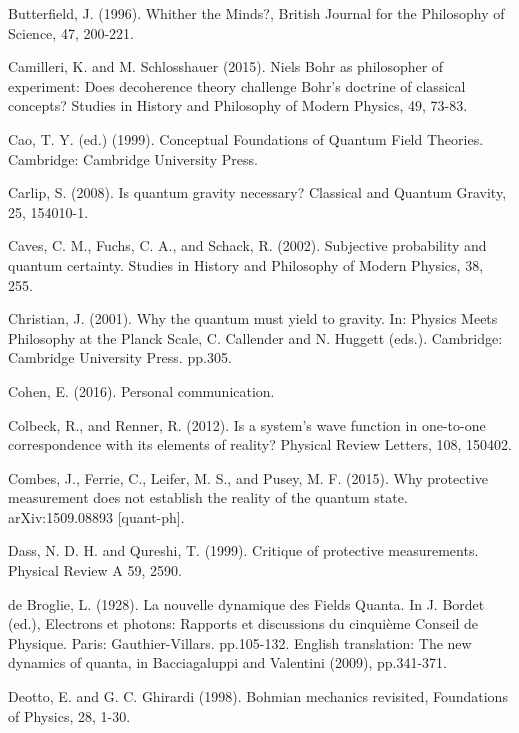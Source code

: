 \begin{thebibliography}{}
\bibitem{} Butterfield, J. (1996). Whither the Minds?, British Journal for the Philosophy of Science, 47, 200-221.

\bibitem{}  Camilleri, K. and M. Schlosshauer (2015). Niels Bohr as philosopher of experiment: Does decoherence theory challenge Bohr's doctrine of classical concepts? Studies in History and Philosophy of Modern Physics, 49, 73-83.

\bibitem{} Cao, T. Y. (ed.) (1999). Conceptual Foundations of Quantum Field Theories. Cambridge: Cambridge University Press.

\bibitem{}  Carlip, S. (2008). Is quantum gravity necessary? Classical and Quantum Gravity, 25, 154010-1.


\bibitem{} Caves, C. M., Fuchs, C. A., and Schack, R. (2002). Subjective probability and quantum certainty. Studies in History and Philosophy of Modern Physics, 38, 255.

\bibitem{} Christian,  J. (2001). Why the quantum must yield to gravity. In: Physics Meets Philosophy at the Planck Scale,  C. Callender and N. Huggett (eds.). Cambridge: Cambridge University Press. pp.305.

\bibitem{} Cohen, E. (2016). Personal communication.

\bibitem{} Colbeck, R., and Renner, R. (2012). Is a system's wave function in one-to-one correspondence with its elements of reality? Physical Review Letters, 108, 150402.

\bibitem{} Combes, J., Ferrie, C., Leifer, M. S., and Pusey, M. F. (2015). Why protective measurement does not establish the reality of the quantum state. arXiv:1509.08893 [quant-ph].

\bibitem{} Dass, N. D. H. and Qureshi, T. (1999). Critique of protective measurements. Physical Review A 59, 2590.

\bibitem{} de Broglie, L. (1928). La nouvelle dynamique des Fields Quanta. In J. Bordet (ed.), Electrons et photons: Rapports et discussions du cinquième Conseil de Physique. Paris: Gauthier-Villars. pp.105-132. English translation: The new dynamics of quanta, in Bacciagaluppi and Valentini (2009), pp.341-371.

\bibitem{}  Deotto, E. and G. C. Ghirardi (1998). Bohmian mechanics revisited, Foundations of Physics, 28,  1-30.


\end{thebibliography}

